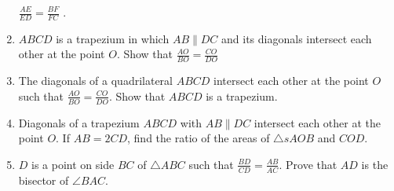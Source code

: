 \begin{enumerate}[label=\thesubsection.\arabic*.,ref=\thesubsection.\theenumi]
$\frac{AE}{ED}=\frac{ BF}{  FC}$ .
\item $ABCD$ is a trapezium in which $AB  \parallel  DC$ and its diagonals intersect each other at the point $O$. Show
that
$\frac{AO}{ BO}=\frac{CO}{  DO}$
\item The diagonals of a quadrilateral $ABCD$ intersect each other at the point $O$ such that $\frac{AO}{ BO}=\frac{CO}{  DO}$.   Show that $ABCD$ is a trapezium.
\item  Diagonals of a trapezium $ABCD$ with $AB  \parallel  DC$ intersect each other at the point $O$. If $AB = 2 CD$, find the ratio of the areas of $\triangle s AOB$ and $COD$.
\item   $D$ is a point on side $BC$ of  $\triangle  ABC$ such that
$\frac{BD}{CD}= \frac{AB}{AC}  $.  Prove that $AD$ is the bisector of  $\angle  BAC$.
\end{enumerate}
